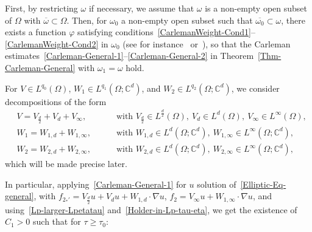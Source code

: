 \documentclass[AHL,Unicode,longabstracts]{cedram}
\newcommand*\C{\mathbb{C}}
\renewcommand{\geq}{\geqslant}
\begin{document}
First, by restricting $\omega$ if necessary, we assume that $\omega$ is a non-empty open subset of $\Omega$ with $\overline\omega \subset \Omega$. Then, for $\omega_0$ a non-empty open subset such that $\overline{\omega_0} \subset \omega$, there exists a function $\varphi$ satisfying conditions~\eqref{CarlemanWeight-Cond1}--\eqref{CarlemanWeight-Cond2} in $\omega_0$ (see for instance~\cite[Lemma~1.1]{Fursikov1996-book} or~\cite[Proposition~3.31]{LeRousseaubookvolume1}), so that the Carleman estimates~\eqref{Carleman-General-1}--\eqref{Carleman-General-2} in Theorem~\ref{Thm-Carleman-General} with $\omega_1 = \omega$ hold.

For $V \in L^{q_0}(\Omega)$, $W_1 \in L^{q_1}(\Omega; \C^d)$, and $W_2 \in L^{q_2}(\Omega; \C^d)$, we consider decompositions of the form
\begin{align*}
& V = V_{\frac{d}{2}} + V_{d}+ V_\infty,
\quad &&\text{ with } V_{\frac{d}{2}} \in L^{\frac{d}{2}}(\Omega),
\ V_{d} \in L^{d}(\Omega),
\ V_{\infty} \in L^{\infty}(\Omega),
\\
& W_1 = W_{1,d} + W_{1,\infty},
\quad &&\text{ with } W_{1,d} \in L^{d}\left(\Omega; \C^d\right),
\ W_{1,\infty} \in L^{\infty}\left(\Omega; \C^d\right),
\\
& W_2 = W_{2,d} + W_{2,\infty},
\quad &&\text{ with } W_{2,d} \in L^{d}\left(\Omega; \C^d\right),
\ W_{2,\infty} \in L^{\infty}\left(\Omega; \C^d\right),
\end{align*}
which will be made precise later.

In particular, applying~\eqref{Carleman-General-1} for $u$ solution of~\eqref{Elliptic-Eq-general}, with $f_{2_*'} = V_{\frac{d}{2}} u + V_{d} u+ W_{1,d} \cdot \nabla u$, $f_2 = V_{\infty} u+ W_{1,\infty} \cdot \nabla u$, and using~\eqref{Lp-larger-Lpetatau} and~\eqref{Holder-in-Lp-tau-eta}, we get the existence of $C_1>0$ such that for $\tau \geq \tau_0$:
\end{document}

